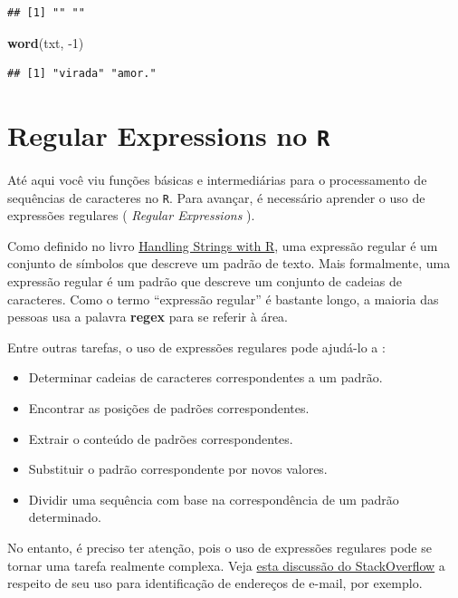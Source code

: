 \documentclass[]{book}
\newenvironment{Shaded}{\begin{snugshade}}{\end{snugshade}}
\newcommand{\DecValTok}[1]{\textcolor[rgb]{0.00,0.00,0.81}{#1}}
\newcommand{\KeywordTok}[1]{\textcolor[rgb]{0.13,0.29,0.53}{\textbf{#1}}}
\newcommand{\NormalTok}[1]{#1}
\providecommand{\tightlist}{%
  \setlength{\itemsep}{0pt}\setlength{\parskip}{0pt}}
\begin{document}
\begin{verbatim}
## [1] "" ""
\end{verbatim}

\begin{Shaded}
\begin{Highlighting}[]
\KeywordTok{word}\NormalTok{(txt, }\DecValTok{-1}\NormalTok{)}
\end{Highlighting}
\end{Shaded}

\begin{verbatim}
## [1] "virada" "amor."
\end{verbatim}

\hypertarget{regular-expressions-no-r}{%
\section{\texorpdfstring{Regular Expressions no \texttt{R}}{Regular Expressions no R}}\label{regular-expressions-no-r}}

Até aqui você viu funções básicas e intermediárias para o processamento de sequências de caracteres no \texttt{R}. Para avançar, é necessário aprender o uso de expressões regulares ( \emph{Regular Expressions} ).

Como definido no livro \href{https://www.gastonsanchez.com/r4strings/regex1.html}{Handling Strings with R}, uma expressão regular é um conjunto de símbolos que descreve um padrão de texto. Mais formalmente, uma expressão regular é um padrão que descreve um conjunto de cadeias de caracteres. Como o termo ``expressão regular'' é bastante longo, a maioria das pessoas usa a palavra \textbf{regex} para se referir à área.

Entre outras tarefas, o uso de expressões regulares pode ajudá-lo a \citep{wickham_r_2017}:

\begin{itemize}
\tightlist
\item
  Determinar cadeias de caracteres correspondentes a um padrão.
\item
  Encontrar as posições de padrões correspondentes.
\item
  Extrair o conteúdo de padrões correspondentes.
\item
  Substituir o padrão correspondente por novos valores.
\item
  Dividir uma sequência com base na correspondência de um padrão determinado.
\end{itemize}

No entanto, é preciso ter atenção, pois o uso de expressões regulares pode se tornar uma tarefa realmente complexa. Veja \href{https://stackoverflow.com/questions/201323/how-to-validate-an-email-address-using-a-regular-expression/201378\#201378}{esta discussão do StackOverflow} a respeito de seu uso para identificação de endereços de e-mail, por exemplo.
\end{document}
